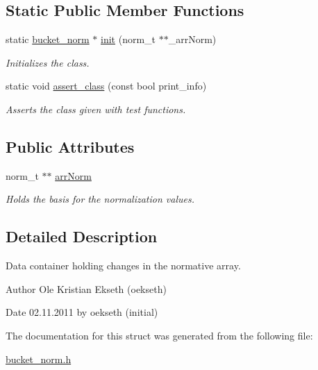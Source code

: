 \subsection*{Static Public Member Functions}
\begin{DoxyCompactItemize}
\item 
\hypertarget{structbucket__norm_a7bf51376588cabfd19ee0dd14adbf30e}{
static \hyperlink{structbucket__norm}{bucket\_\-norm} $\ast$ \hyperlink{structbucket__norm_a7bf51376588cabfd19ee0dd14adbf30e}{init} (norm\_\-t $\ast$$\ast$\_\-arrNorm)}
\label{structbucket__norm_a7bf51376588cabfd19ee0dd14adbf30e}

\begin{DoxyCompactList}\small\item\em Initializes the class. \end{DoxyCompactList}\item 
\hypertarget{structbucket__norm_ad69cb0d41e96049c0bede08fa7b64737}{
static void \hyperlink{structbucket__norm_ad69cb0d41e96049c0bede08fa7b64737}{assert\_\-class} (const bool print\_\-info)}
\label{structbucket__norm_ad69cb0d41e96049c0bede08fa7b64737}

\begin{DoxyCompactList}\small\item\em Asserts the class given with test functions. \end{DoxyCompactList}\end{DoxyCompactItemize}
\subsection*{Public Attributes}
\begin{DoxyCompactItemize}
\item 
\hypertarget{structbucket__norm_a4b042ee9fc3c297388c5ec62841597b1}{
norm\_\-t $\ast$$\ast$ \hyperlink{structbucket__norm_a4b042ee9fc3c297388c5ec62841597b1}{arrNorm}}
\label{structbucket__norm_a4b042ee9fc3c297388c5ec62841597b1}

\begin{DoxyCompactList}\small\item\em Holds the basis for the normalization values. \end{DoxyCompactList}\end{DoxyCompactItemize}


\subsection{Detailed Description}
Data container holding changes in the normative array. 

\begin{DoxyAuthor}{Author}
Ole Kristian Ekseth (oekseth) 
\end{DoxyAuthor}
\begin{DoxyDate}{Date}
02.11.2011 by oekseth (initial) 
\end{DoxyDate}


The documentation for this struct was generated from the following file:\begin{DoxyCompactItemize}
\item 
\hyperlink{bucket__norm_8h}{bucket\_\-norm.h}\end{DoxyCompactItemize}

